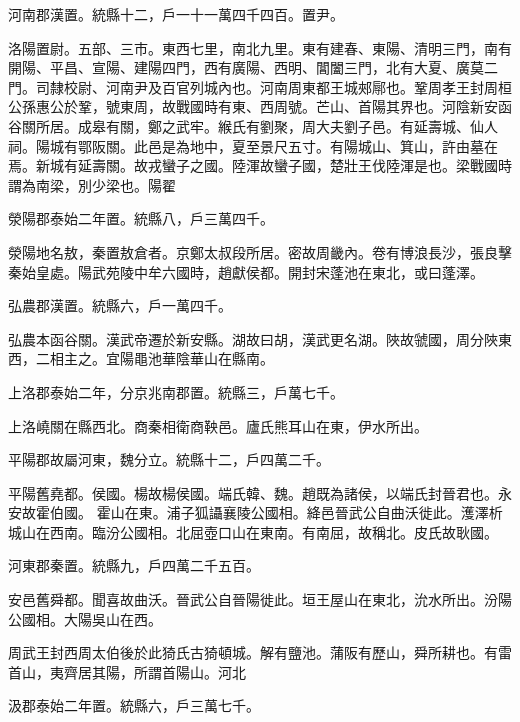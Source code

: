 \begin{pinyinscope}
 河南郡漢置。統縣十二，戶一十一萬四千四百。置尹。



 洛陽置尉。五部、三市。東西七里，南北九里。東有建春、東陽、清明三門，南有開陽、平昌、宣陽、建陽四門，西有廣陽、西明、閶闔三門，北有大夏、廣莫二門。司隸校尉、河南尹及百官列城內也。河南周東都王城郟鄏也。鞏周孝王封周桓公孫惠公於鞏，號東周，故戰國時有東、西周號。芒山、首陽其界也。河陰新安函谷關所居。成皋有關，鄭之武牢。緱氏有劉聚，周大夫劉子邑。有延壽城、仙人祠。陽城有鄂阪關。此邑是為地中，夏至景尺五寸。有陽城山、箕山，許由墓在焉。新城有延壽關。故戎蠻子之國。陸渾故蠻子國，楚壯王伐陸渾是也。梁戰國時謂為南梁，別少梁也。陽翟



 滎陽郡泰始二年置。統縣八，戶三萬四千。



 滎陽地名敖，秦置敖倉者。京鄭太叔段所居。密故周畿內。卷有博浪長沙，張良擊秦始皇處。陽武苑陵中牟六國時，趙獻侯都。開封宋蓬池在東北，或曰蓬澤。



 弘農郡漢置。統縣六，戶一萬四千。



 弘農本函谷關。漢武帝遷於新安縣。湖故曰胡，漢武更名湖。陜故虢國，周分陜東西，二相主之。宜陽黽池華陰華山在縣南。



 上洛郡泰始二年，分京兆南郡置。統縣三，戶萬七千。



 上洛嶢關在縣西北。商秦相衛商鞅邑。廬氏熊耳山在東，伊水所出。



 平陽郡故屬河東，魏分立。統縣十二，戶四萬二千。



 平陽舊堯都。侯國。楊故楊侯國。端氏韓、魏。趙既為諸侯，以端氏封晉君也。永安故霍伯國。
 霍山在東。浦子狐讘襄陵公國相。絳邑晉武公自曲沃徙此。濩澤析城山在西南。臨汾公國相。北屈壺口山在東南。有南屈，故稱北。皮氏故耿國。



 河東郡秦置。統縣九，戶四萬二千五百。



 安邑舊舜都。聞喜故曲沃。晉武公自晉陽徙此。垣王屋山在東北，沇水所出。汾陽公國相。大陽吳山在西。



 周武王封西周太伯後於此猗氏古猗頓城。解有鹽池。蒲阪有歷山，舜所耕也。有雷首山，夷齊居其陽，所謂首陽山。河北



 汲郡泰始二年置。統縣六，戶三萬七千。




\end{pinyinscope}
